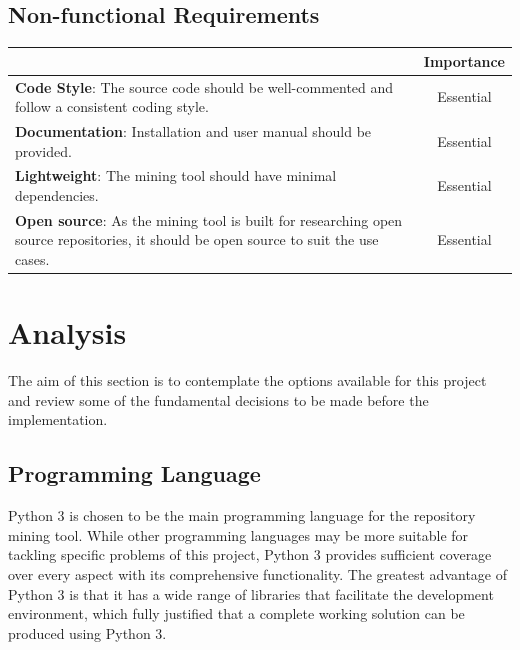 \documentclass[12pt, a4paper]{report}
\begin{document}
\subsection{Non-functional Requirements}
\begin{table}[H]
	\begin{center}
		\begin{tabular}{|p{10.3cm}|c|}
			\hline
			\rowcolor[HTML]{D8D8D8}
			\multicolumn{1}{|c|}{Criteria} & Importance \\ \hline
			\textbf{Code Style}: The source code should be well-commented and follow a consistent coding
      style. & Essential \\ \hline
      \textbf{Documentation}: Installation and user manual should be provided. & Essential \\ \hline
      \textbf{Lightweight}: The mining tool should have minimal dependencies. & Essential \\ \hline
      \textbf{Open source}: As the mining tool is built for researching open source repositories, it
      should be open source to suit the use cases. & Essential \\
      \hline
			\end{tabular}
		 \label{table:nonfunc_req}
	\end{center}
\end{table}

\section{Analysis}
The aim of this section is to contemplate the options available for this project and review some of
the fundamental decisions to be made before the implementation.

\subsection{Programming Language}
Python 3 \cite{python} is chosen to be the main programming language for the repository mining tool.
While other programming languages may be more suitable for tackling specific problems of this
project, Python 3 provides sufficient coverage over every aspect with its comprehensive
functionality. The greatest advantage of Python 3 is that it has a wide range of libraries that
facilitate the development environment, which fully justified that a complete working solution can
be produced using Python 3.
\end{document}
